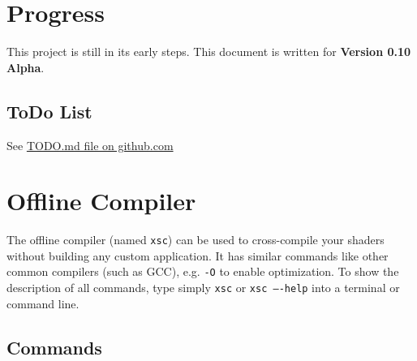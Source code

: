 \documentclass{article}
\begin{document}
\newpage
\section{Progress}

This project is still in its early steps. This document is written for \XSC \textbf{Version 0.10 Alpha}.

\subsection{ToDo List}
See \href{https://github.com/LukasBanana/XShaderCompiler/blob/master/TODO.md}{TODO.md file on github.com}



\newpage
\section{Offline Compiler}

The offline compiler (named \texttt{xsc}) can be used to cross-compile your shaders without building any custom application.
It has similar commands like other common compilers (such as GCC), e.g. \texttt{-O} to enable optimization.
To show the description of all commands, type simply \texttt{xsc} or \texttt{xsc ----help} into a terminal or command line.

\subsection{Commands}
\end{document}
